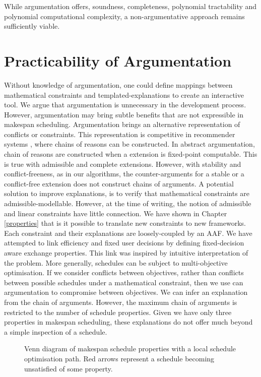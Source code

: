 While argumentation offers, soundness, completeness, polynomial tractability and polynomial computational complexity, a non-argumentative approach remains sufficiently viable.

\section{Practicability of Argumentation}
\label{practicability}

Without knowledge of argumentation, one could define mappings between mathematical constraints and templated-explanations to create an interactive tool. We argue that argumentation is unnecessary in the development process. However, argumentation may bring subtle benefits that are not expressible in makespan scheduling.
\linespace
Argumentation brings an alternative representation of conflicts or constraints. This representation is competitive in recommender systems \cite{recommend}, where chains of reasons can be constructed. In abstract argumentation, chain of reasons are constructed when a extension is fixed-point computable. This is true with admissible and complete extensions. However, with stability and conflict-freeness, as in our algorithms, the counter-arguments for a stable or a conflict-free extension does not construct chains of arguments. A potential solution to improve explanations, is to verify that mathematical constraints are admissible-modellable. However, at the time of writing, the notion of admissible and linear constraints have little connection. 
\linespace
We have shown in Chapter \ref{properties} that is it possible to translate new constraints to new frameworks. Each constraint and their explanations are loosely-coupled by an AAF. We have attempted to link efficiency and fixed user decisions by defining fixed-decision aware exchange properties. This link was inspired by intuitive interpretation of the problem. More generally, schedules can be subject to multi-objective optimisation. If we consider conflicts between objectives, rather than conflicts between possible schedules under a mathematical constraint, then we use can argumentation to compromise between objectives. We can infer an explanation from the chain of arguments. However, the maximum chain of arguments is restricted to the number of schedule properties. Given we have only three properties in makespan scheduling, these explanations do not offer much beyond a simple inspection of a schedule.

\begin{figure}[H]
	\label{problempath}
	
	\caption{Venn diagram of makespan schedule properties with a local schedule optimisation path. Red arrows represent a schedule becoming unsatisfied of some property.}
\end{figure}

